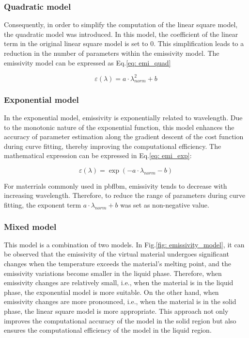 \subsubsection{Quadratic model}
Consequently, in order to simplify the computation of the linear 
square model, the quadratic model was introduced. In this model, 
the coefficient of the linear term in the original linear square 
model is set to 0. This simplification leads to a reduction in 
the number of parameters within the emissivity model. The emissivity model 
can be expressed as Eq.\ref{eq: emi_quad}

\begin{equation}
  \label{eq: emi_quad}
  \varepsilon(\lambda) = a \cdot \lambda_{norm}^2 + b
\end{equation}

\subsubsection{Exponential model}
In the exponential model, emissivity is exponentially related to wavelength. Due to 
the monotonic nature of the exponential function, this model enhances the accuracy of 
parameter estimation along the gradient descent of the cost function during curve fitting, 
thereby improving the computational efficiency. The mathematical expression can be 
expressed in Eq.\ref{eq: emi_exp}:

\begin{equation}
  \label{eq: emi_exp}
  \varepsilon(\lambda) = \exp(-a \cdot \lambda_{norm} - b)
\end{equation}

For materrials commonly used in \gls{pbflbm}, emissivity tends to decrease with 
increasing wavelength. Therefore, to reduce the range of parameters during curve 
fitting, the exponent term $a \cdot \lambda_{norm} + b$ was set as non-negative value.

\subsubsection{Mixed model}
This model is a combination of two models. In Fig.\ref{fig: emissivity_model}, it 
can be observed that the emissivity of the virtual material undergoes 
significant changes when the temperature exceeds the material's melting point, 
and the emissivity variations become smaller in the liquid phase. Therefore, when 
emissivity changes are relatively small, i.e., when the material is in the 
liquid phase, the exponential model is more suitable. On the other hand, when 
emissivity changes are more pronounced, i.e., when the material is in the solid 
phase, the linear square model is more appropriate. This approach not only 
improves the computational accuracy of the model in the solid region but also 
ensures the computational efficiency of the model in the liquid region.



